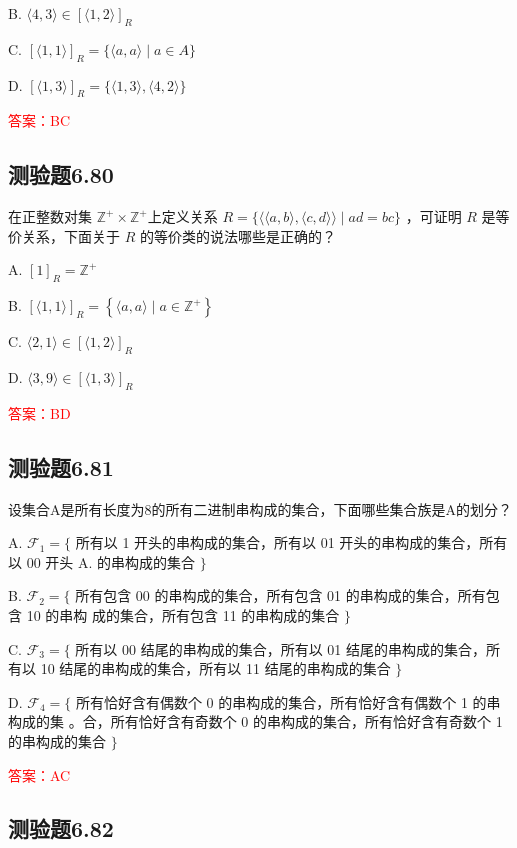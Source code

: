 \documentclass[UTF8, heading=true]{ctexart}
\begin{document}
B. $\langle 4,3\rangle \in[\langle 1,2\rangle]_R$

C. $[\langle 1,1\rangle]_R=\{\langle a, a\rangle \mid a \in A\}$

D. $[\langle 1,3\rangle]_R=\{\langle 1,3\rangle,\langle 4,2\rangle\}$


\textcolor{red}{答案：BC}

\subsection{测验题6.80}

在正整数对集 $\mathbb{Z}^{+} \times \mathbb{Z}^{+}$上定义关系 $R=\{\langle\langle a, b\rangle,\langle c, d\rangle\rangle \mid a d=b c\}$ ，可证明 $R$ 是等价关系，下面关于 $R$ 的等价类的说法哪些是正确的？

A. $[1]_R=\mathbb{Z}^{+}$

B. $[\langle 1,1\rangle]_R=\left\{\langle a, a\rangle \mid a \in \mathbb{Z}^{+}\right\}$

C. $\langle 2,1\rangle \in[\langle 1,2\rangle]_R$

D. $\langle 3,9\rangle \in[\langle 1,3\rangle]_R$

\textcolor{red}{答案：BD}

\subsection{测验题6.81}

设集合A是所有长度为8的所有二进制串构成的集合，下面哪些集合族是A的划分？

A. $\mathcal{F}_1=\{$ 所有以 1 开头的串构成的集合，所有以 01 开头的串构成的集合，所有以 00 开头 A. 的串构成的集合 $\}$

B. $\mathcal{F}_2=\{$ 所有包含 00 的串构成的集合，所有包含 01 的串构成的集合，所有包含 10 的串构
成的集合，所有包含 11 的串构成的集合 $\}$

C. $\mathcal{F}_3=\{$ 所有以 00 结尾的串构成的集合，所有以 01 结尾的串构成的集合，所有以 10 结尾的串构成的集合，所有以 11 结尾的串构成的集合 $\}$

D. $\mathcal{F}_4=\{$ 所有恰好含有偶数个 0 的串构成的集合，所有恰好含有偶数个 1 的串构成的集
。合，所有恰好含有奇数个 0 的串构成的集合，所有恰好含有奇数个 1 的串构成的集合 $\}$


\textcolor{red}{答案：AC}

\subsection{测验题6.82}
\end{document}
